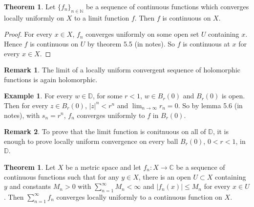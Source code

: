 \documentclass[12pt,a4paper]{article}
\theoremstyle{definition}
\newtheorem{theorem}[definition]{Theorem}
\newtheorem{example}[definition]{Example}
\newtheorem*{remark}{Remark}
\begin{document}
\begin{theorem}
	Let ${\{f_n\}}_{n \in \mathbb{N}}$ be a sequence of continuous functions which converges locally uniformly on $X$ to a limit function $f$. Then $f$ is continuous on $X$.
\end{theorem}

\begin{proof}
	For every $x \in X$, $f_n$ converges uniformly on some open set $U$ containing $x$. Hence $f$ is continuous on $U$ by theorem 5.5 (in notes). So $f$ is continuous at $x$ for every $x \in X$.
\end{proof}

\begin{remark}
	The limit of a locally uniform convergent sequence of holomorphic functions is again holomorphic.
\end{remark}

\begin{example}
	For every $w \in \mathbb{D}$, for some $r < 1$, $w \in B_r(0)$ and $B_r(0)$ is open. Then for every $z \in B_r(0)$, $|z|^n < r^n$ and $\lim_{n \rightarrow \infty} r_n = 0$. So by lemma 5.6 (in notes), with $s_n = r^n$, $f_n$ converges uniformly to $f$ in $B_r(0)$.
\end{example}

\begin{remark}
	To prove that the limit function is conitnuous on all of $\mathbb{D}$, it is enough to prove locally uniform convergence on every ball $B_r(0)$, $0 < r < 1$, in $\mathbb{D}$.
\end{remark}

\begin{theorem}
	Let $X$ be a metric space and let $f_n: X \rightarrow \mathbb{C}$ be a sequence of continuous functions such that for any $y \in X$, there is an open $U \subset X$ containing $y$ and constants $M_n > 0$ with $\sum_{n = 1}^{\infty} M_n < \infty$ and $|f_n(x)| \le M_n$ for every $x \in U$. Then $\sum_{n = 1}^{\infty} f_n$ converges locally uniformly to a continuous function on $X$.
\end{theorem}
\end{document}
